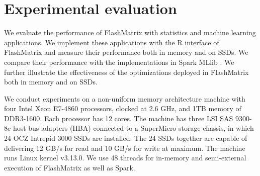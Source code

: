 \section{Experimental evaluation}
We evaluate the performance of FlashMatrix with statistics and machine learning
applications. We implement these applications with the R interface of FlashMatrix
and measure their performance both in memory and on SSDs. We compare their
performance with the implementations in Spark MLlib \cite{}. We further
illustrate the effectiveness of the optimizations deployed in FlashMatrix
both in memory and on SSDs.

We conduct experiments on a non-uniform memory architecture machine with
four Intel Xeon E7-4860 processors, clocked at 2.6 GHz, and 1TB memory of
DDR3-1600. Each processor has 12 cores. The machine has three LSI SAS 9300-8e
host bus adapters (HBA) connected to a SuperMicro storage chassis, in which
24 OCZ Intrepid 3000 SSDs are installed. The 24 SSDs together are capable of
delivering 12 GB/s for read and 10 GB/s for write at maximum. The machine runs
Linux kernel v3.13.0. We use 48 threads for in-memory and semi-external execution
of FlashMatrix as well as Spark.

